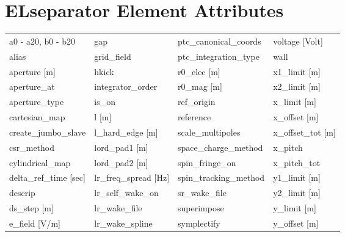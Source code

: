  \section{ELseparator Element Attributes}
 \label{s:list.elseparator}
 
 \begin{tabular}{llll} \toprule
a0 - a20, b0 - b20             & gap                            & ptc_canonical_coords           & voltage [Volt]                 \\
alias                          & grid_field                     & ptc_integration_type           & wall                           \\
aperture [m]                   & hkick                          & r0_elec [m]                    & x1_limit [m]                   \\
aperture_at                    & integrator_order               & r0_mag [m]                     & x2_limit [m]                   \\
aperture_type                  & is_on                          & ref_origin                     & x_limit [m]                    \\
cartesian_map                  & l [m]                          & reference                      & x_offset [m]                   \\
create_jumbo_slave             & l_hard_edge [m]                & scale_multipoles               & x_offset_tot [m]               \\
csr_method                     & lord_pad1 [m]                  & space_charge_method            & x_pitch                        \\
cylindrical_map                & lord_pad2 [m]                  & spin_fringe_on                 & x_pitch_tot                    \\
delta_ref_time [sec]           & lr_freq_spread [Hz]            & spin_tracking_method           & y1_limit [m]                   \\
descrip                        & lr_self_wake_on                & sr_wake_file                   & y2_limit [m]                   \\
ds_step [m]                    & lr_wake_file                   & superimpose                    & y_limit [m]                    \\
e_field [V/m]                  & lr_wake_spline                 & symplectify                    & y_offset [m]                   \\

\end{tabular}
